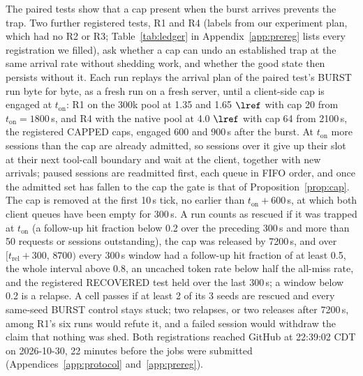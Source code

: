 The paired tests show that a cap present when the burst arrives prevents the trap. Two further registered tests, R1 and R4 (labels from our experiment plan, which had no R2 or R3; Table~\ref{tab:ledger} in Appendix~\ref{app:prereg} lists every registration we filled), ask whether a cap can undo an established trap at the same arrival rate without shedding work, and whether the good state then persists without it. Each run replays the arrival plan of the paired test's BURST run byte for byte, as a fresh run on a fresh server, until a client-side cap is engaged at $t_{\mathrm{on}}$: R1 on the 300k pool at 1.35 and 1.65 $\lref$ with cap 20 from $t_{\mathrm{on}}=1800$\,s, and R4 with the native pool at 4.0 $\lref$ with cap 64 from 2100\,s, the registered CAPPED caps, engaged 600 and 900\,s after the burst. At $t_{\mathrm{on}}$ more sessions than the cap are already admitted, so sessions over it give up their slot at their next tool-call boundary and wait at the client, together with new arrivals; paused sessions are readmitted first, each queue in FIFO order, and once the admitted set has fallen to the cap the gate is that of Proposition~\ref{prop:cap}. The cap is removed at the first 10\,s tick, no earlier than $t_{\mathrm{on}}+600$\,s, at which both client queues have been empty for 300\,s. A run counts as rescued if it was trapped at $t_{\mathrm{on}}$ (a follow-up hit fraction below 0.2 over the preceding 300\,s and more than 50 requests or sessions outstanding), the cap was released by 7200\,s, and over $[t_{\mathrm{rel}}+300,\,8700)$ every 300\,s window had a follow-up hit fraction of at least 0.5, the whole interval above 0.8, an uncached token rate below half the all-miss rate, and the registered RECOVERED test held over the last 300\,s; a window below 0.2 is a relapse. A cell passes if at least 2 of its 3 seeds are rescued and every same-seed BURST control stays stuck; two relapses, or two releases after 7200\,s, among R1's six runs would refute it, and a failed session would withdraw the claim that nothing was shed. Both registrations reached GitHub at 22:39:02 CDT on 2026-10-30, 22 minutes before the jobs were submitted (Appendices~\ref{app:protocol} and~\ref{app:prereg}).

